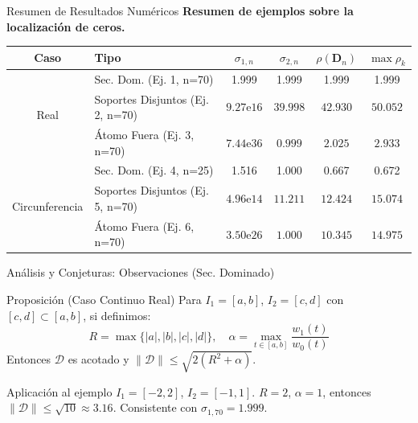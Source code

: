 \begin{frame}{Resumen de Resultados Numéricos}
	\scriptsize
	\centering
	\textbf{Resumen de ejemplos sobre la localización de ceros.}
	\vspace{0.5em}
	\begin{tabular}{|c|l|c|c|c|c|}
		\hline
		\textbf{Caso}                   & \textbf{Tipo}                    & $\sigma_{1,n}$   & $\sigma_{2,n}$ & $\rho(\mathbf{D}_{n})$ & $\max\rho_k$ \\
		\hline
		\multirow{3}{*}{Real}           & Sec. Dom. (Ej. 1, n=70)          & 1.999            & 1.999          & 1.999                  & 1.999        \\
		                                & Soportes Disjuntos (Ej. 2, n=70) & $9.27\text{e}16$ & $39.998$       & $42.930$               & $50.052$     \\
		                                & Átomo Fuera (Ej. 3, n=70)        & $7.44\text{e}36$ & $0.999$        & $2.025$                & $2.933$      \\
		\hline
		\multirow{3}{*}{Circunferencia} & Sec. Dom. (Ej. 4, n=25)          & 1.516            & 1.000          & 0.667                  & 0.672        \\
		                                & Soportes Disjuntos (Ej. 5, n=70) & $4.96\text{e}14$ & $11.211$       & $12.424$               & $15.074$     \\
		                                & Átomo Fuera (Ej. 6, n=70)        & $3.50\text{e}26$ & $1.000$        & $10.345$               & $14.975$     \\
		\hline
	\end{tabular}
\end{frame}

\begin{frame}{Análisis y Conjeturas: Observaciones (Sec. Dominado)}
	\begin{block}{Proposición (Caso Continuo Real)} \small
		Para $I_1=[a,b]$, $I_2=[c,d]$ con $[c,d] \subset [a,b]$, si definimos:
		$$R = \max\{|a|,|b|,|c|,|d|\}, \quad \alpha = \max_{t\in[a,b]}\frac{w_1(t)}{w_0(t)}$$
		Entonces $\mathcal{D}$ es acotado y $\|\mathcal{D}\| \le \sqrt{2(R^{2}+\alpha)}$.
	\end{block}
	\pause
	\begin{exampleblock}{Aplicación al ejemplo}
		$I_1 = [-2,2]$, $I_2 = [-1,1]$.
		$R = 2$, $\alpha = 1$, entonces $\|\mathcal{D}\| \le \sqrt{10} \approx 3.16$.
		Consistente con $\sigma_{1,70} = 1.999$.
	\end{exampleblock}
\end{frame}

